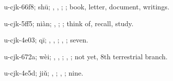 \begin{multicols}{2}
{\cjkgGlue{}u-cjk-66f8; shū; \cjkgGlue{}\cjkgGlue{}\cjkgGlue{}, \cjkgGlue{}\cjkgGlue{}\cjkgGlue{}, \cjkgGlue{}; \cjkgGlue{}; book, letter, document, writings.

\cjkgGlue{}u-cjk-5ff5; niàn; \cjkgGlue{}, \cjkgGlue{}; \cjkgGlue{}; think of, recall, study.

\cjkgGlue{}u-cjk-4e03; qī; \cjkgGlue{}, \cjkgGlue{}\cjkgGlue{}\cjkgGlue{}, \cjkgGlue{}; \cjkgGlue{}, \cjkgGlue{}; seven.

\cjkgGlue{}u-cjk-672a; wèi; \cjkgGlue{}\cjkgGlue{}\cjkgGlue{}, \cjkgGlue{}\cjkgGlue{}\cjkgGlue{}, \cjkgGlue{}; \cjkgGlue{}, \cjkgGlue{}; not yet, 8th terrestrial branch.

\cjkgGlue{}u-cjk-4e5d; jiǔ; \cjkgGlue{}, \cjkgGlue{}\cjkgGlue{}\cjkgGlue{}; \cjkgGlue{}, \cjkgGlue{}; nine.

}
\end{multicols}
